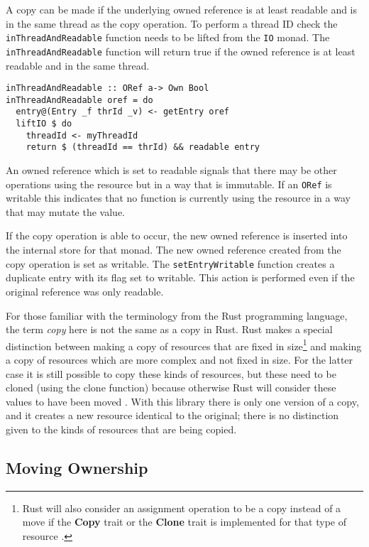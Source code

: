 \documentclass[onehalf,11pt]{beavtex}
\begin{document}
A copy can be made if the underlying owned reference is at least readable and
is in the same thread as the copy operation.
To perform a thread ID check the \texttt{inThreadAndReadable} function
needs to be lifted from the \texttt{IO} monad.
The \texttt{inThreadAndReadable} function will return true if the owned reference
is at least readable and in the same thread.

\begin{verbatim}
inThreadAndReadable :: ORef a-> Own Bool
inThreadAndReadable oref = do
  entry@(Entry _f thrId _v) <- getEntry oref
  liftIO $ do
    threadId <- myThreadId
    return $ (threadId == thrId) && readable entry
\end{verbatim}

An owned reference which is set to readable signals that there may be other
operations using the resource but in a way that is immutable.
If an \texttt{ORef} is writable this indicates that no function is currently
using the resource in a way that may mutate the value.

If the copy operation is able to occur, the new owned reference is inserted into
the internal store for that monad.  The new owned reference created from the copy
operation is set as writable. The \texttt{setEntryWritable} function
creates a duplicate entry with its flag set to writable.
This action is performed even if the original reference was only readable.

For those familiar with the terminology from the Rust programming language, the
term \textit{copy} here is not the same as a copy in Rust. Rust makes a special
distinction between making a copy of resources that are fixed in
size\footnote{Rust will also consider an assignment operation to be a copy
  instead of a move if the \textbf{Copy} trait or the \textbf{Clone} trait is
  implemented for that type of
  resource \cite{rust_docs_clone_trait, rust_book_traits}. 
  }
and making a copy of resources which are more complex and not fixed in size.
For the latter case it is still possible to copy these kinds of resources, but
these need to be cloned (using the clone function) because otherwise Rust will
consider these values to have been moved \cite{rust_book_ownership}.
With this library there is only one version of a copy, and it creates a new
resource identical to the original; there is no distinction given to the kinds
of resources that are being copied.

\subsection{Moving Ownership}
\end{document}
